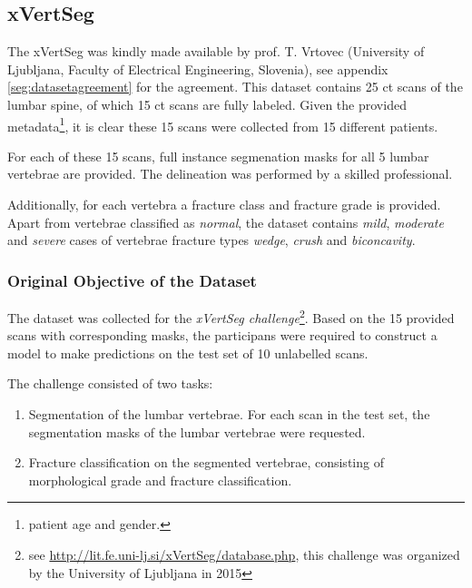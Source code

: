 \subsection{xVertSeg\label{sec:xVertSeg}}



The xVertSeg \cite{Ibragimov2014, Korez2015} was kindly made available by prof. T. Vrtovec (University of Ljubljana, Faculty of Electrical Engineering, Slovenia), see appendix \ref{seg:datasetagreement} for the agreement.
This dataset contains 25 \acrfull{ct} scans of the lumbar spine, of which 15 \acrshort{ct} scans are fully labeled.
Given the provided metadata\footnote{patient age and gender.}, it is clear these 15 scans were collected from 15 different patients.

For each of these 15 scans, full instance segmenation masks for all 5 lumbar vertebrae are provided. The delineation was performed by a skilled professional.

Additionally, for each vertebra a fracture class and fracture grade is provided. 
Apart from vertebrae classified as \textit{normal}, the dataset contains \textit{mild}, \textit{moderate} and \textit{severe} cases of vertebrae fracture types \textit{wedge}, \textit{crush} and \textit{biconcavity}.

\subsubsection{Original Objective of the Dataset}

The dataset was collected for the \textit{xVertSeg challenge}\footnote{see \url{http://lit.fe.uni-lj.si/xVertSeg/database.php}, this challenge was organized by the University of Ljubljana in 2015}.
Based on the 15 provided scans with corresponding masks, the participans were required to construct a model to make predictions on the test set of 10 unlabelled scans.

The challenge consisted of two tasks:
\begin{enumerate}
    \item Segmentation of the lumbar vertebrae. For each scan in the test set, the segmentation masks of the lumbar vertebrae were requested.
    \item Fracture classification on the segmented vertebrae, consisting of morphological grade and fracture classification.
\end{enumerate}


